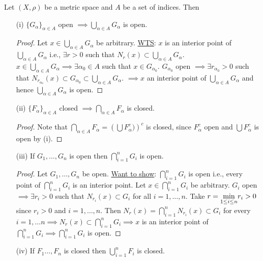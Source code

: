 \documentclass[]{article}
\begin{document}
\begin{theorem}
	Let $(X,\rho)$ be a metric space and $A$ be a set of indices. Then
	\begin{enumerate}
		\item[(i)] $\{G_\alpha\}_{\alpha\in A}$ open $\implies \bigcup_{\alpha\in A} G_\alpha$ is open.
			\begin{proof}
				Let $x\in \bigcup_{\alpha\in A} G_\alpha$ be arbitrary.
				\ul{WTS}: $x$ is an interior point of $\bigcup_{\alpha\in A} G_\alpha$ i.e., $\exists r>0$ such that $N_r(x)\subset \bigcup_{\alpha\in A} G_\alpha$.
				$x\in\bigcup_{\alpha\in A}G_\alpha \implies \exists \alpha_0\in A$ such that $x\in G_{\alpha_0}$.
				$G_{\alpha_0}$ open $\implies \exists r_{\alpha_0}>0$ such that $N_{r_{\alpha_0}}(x)\subset G_{\alpha_0} \subset \bigcup_{\alpha\in A} G_\alpha$.
				$\implies x$ an interior point of $\bigcup_{\alpha\in A} G_\alpha$ and hence $\bigcup_{\alpha\in A} G_\alpha$ is open.
			\end{proof}
		\item[(ii)] $\{F_\alpha\}_{\alpha\in A}$ closed $\implies \bigcap_{\alpha\in A} F_\alpha$ is closed.
			\begin{proof}
				Note that $\bigcap_{\alpha\in A} F_\alpha = \left(\bigcup F_\alpha^c)\right)^c$ is closed, since $F_\alpha^c$ open and $\bigcup F_\alpha^c$ is open by (i).
			\end{proof}
		\item[(iii)] If $G_1,\dots,G_n$ is open then $\bigcap_{i=1}^n G_i$ is open.
			\begin{proof}
				Let $G_1,\dots,G_n$ be open.
				\ul{Want to show}: $\bigcap_{i=1}^n G_i$ is open i.e., every point of $\bigcap_{i=1}^n G_i$ is an interior point.
				Let $x\in\bigcap_{i=1}^n G_i$ be arbitrary. $G_i$ open $\implies\exists r_i>0$ such that $N_{r_i}(x)\subset G_i$ for all $i=1,\dots,n$.
				Take $r=\underset{1\leq i\leq n}{\min} r_i>0$ since $r_i>0$ and $i=1,\dots,n$.
				Then $N_r(x) = \bigcap_{i=1}^n N_{r_i}(x)\subset G_i$ for every $i=1,\dots n \implies N_r(x)\subset\bigcap_{i=1}^n G_i \implies x$ is an interior point of $\bigcap_{i=1}^n G_i \implies \bigcap_{i=1}^n G_i$ is open.
			\end{proof}
		\item[(iv)] If $F_1\dots,F_n$ is closed then $\bigcup_{i=1}^n F_i$ is closed.
	\end{enumerate}
\end{theorem}
\end{document}
